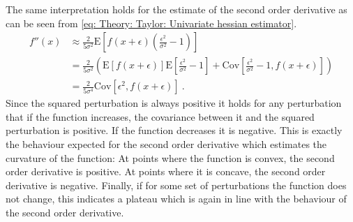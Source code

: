 The same interpretation holds for the estimate of the second order derivative as can be seen from \eqref{eq: Theory: Taylor: Univariate hessian estimator}.
\begin{align*}
    f''(x)
    &\approx \frac{2}{5\sigma^2}\text{E}\left[f(x+\epsilon)\left(\frac{\epsilon^2}{\sigma^2} - 1\right)\right]\\
    &= \frac{2}{5\sigma^2}\left(\text{E}\left[f(x+\epsilon)\right]\text{E}\left[\frac{\epsilon^2}{\sigma^2} - 1\right] + \text{Cov}\left[\frac{\epsilon^2}{\sigma^2} - 1, f(x+\epsilon)\right]\right)\\
    &= \frac{2}{5\sigma^4}\text{Cov}\left[\epsilon^2, f(x+\epsilon)\right] \ .
\end{align*}
Since the squared perturbation is always positive it holds for any perturbation that if the function increases, the covariance between it and the squared perturbation is positive. If the function decreases it is negative. This is exactly the behaviour expected for the second order derivative which estimates the curvature of the function: At points where the function is convex, the second order derivative is positive. At points where it is concave, the second order derivative is negative. Finally, if for some set of perturbations the function does not change, this indicates a plateau which is again in line with the behaviour of the second order derivative.


